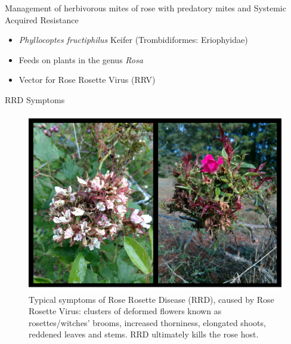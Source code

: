 \documentclass[
  ignorenonframetext,
]{beamer}
\author{}
\date{\vspace{-2.5em}}
\providecommand{\tightlist}{%
  \setlength{\itemsep}{0pt}\setlength{\parskip}{0pt}}
\begin{document}
\begin{frame}
\begin{block}{Management of herbivorous mites of rose with predatory
mites and Systemic Acquired Resistance}
\protect\hypertarget{management-of-herbivorous-mites-of-rose-with-predatory-mites-and-systemic-acquired-resistance}{}
\begin{itemize}
\tightlist
\item
  \emph{Phyllocoptes fructiphilus} Keifer (Trombidiformes: Eriophyidae)
\item
  Feeds on plants in the genus \emph{Rosa}
\item
  Vector for Rose Rosette Virus (RRV)
\end{itemize}
\end{block}

\begin{block}{RRD Symptoms}
\protect\hypertarget{rrd-symptoms}{}
\begin{figure}
\includegraphics[width=0.8\linewidth]{asa-presentation-2021-denver_files/figure-beamer/rrd-symptoms-1} \caption{Typical symptoms of Rose Rosette Disease (RRD), caused by Rose Rosette Virus: clusters of deformed flowers known as rosettes/witches' brooms, increased thorniness, elongated shoots, reddened leaves and stems. RRD ultimately kills the rose host.}\label{fig:rrd-symptoms}
\end{figure}


\end{block}
\end{frame}
\end{document}
